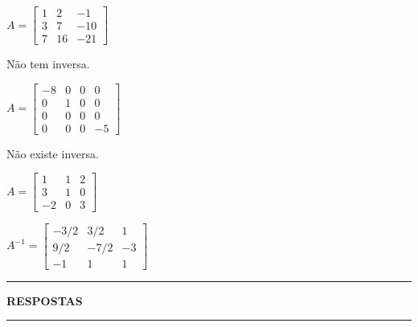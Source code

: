 \documentclass[12pt]{exam}
\begin{document}
\begin{exercicio}
  $
    A =\begin{bmatrix}
        1 & 2 & -1\\
        3 & 7 & -10\\
        7 & 16 & -21
    \end{bmatrix}
  $
  \begin{solucao}
    N\~ao tem inversa.
  \end{solucao}
\end{exercicio}

\begin{exercicio}
  $
    A =\begin{bmatrix}
        -8 & 0 & 0 & 0\\
        0 & 1 & 0 & 0\\
        0 & 0 & 0 & 0\\
        0 & 0 & 0 & -5
    \end{bmatrix}
  $
  \begin{solucao}
   N\~ao existe inversa.
  \end{solucao}
\end{exercicio}

\begin{exercicio}\label{matrizinversafim}
  $
    A =\begin{bmatrix}
        1 & 1 & 2\\
        3 & 1 & 0\\
        -2 & 0 & 3
    \end{bmatrix}
  $
  \begin{solucao}
    $
      A^{-1} =\begin{bmatrix}
        -3/2 & 3/2 & 1\\
        9/2 & -7/2 & -3\\
        -1 & 1 & 1
      \end{bmatrix}
    $
  \end{solucao}
\end{exercicio}

\newpage
{}
\hrule
\begin{center}
{\large\bf RESPOSTAS}
\end{center}
\hrule

\end{document}
